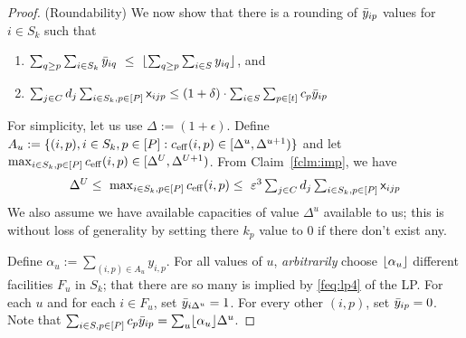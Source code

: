 \begin{proof}
\noindent
(Roundability)
We now show that there is a rounding of $\bar{y}_{ip}$ values for $i\in S_k$ such that
		\begin{enumerate}
			\item $\sum_{q \geq p} \sum_{i\in S_k} \bar{y}_{iq} ~\leq~ \lfloor\sum_{q \geq p}\sum_{i\in S} y_{iq}\rfloor$, and
			\item $\sum_{j\in C} d_j \sum_{i\in S_k,p\in [P]} {\mathsf x}_{ijp} \leq (1+\delta)\cdot \sum_{i\in S} \sum_{p\in [t]} c_p\bar{y}_{ip}$
		\end{enumerate}

\noindent
For simplicity, let us use $\Delta := (1+\epsilon)$.
Define $A_u := \{(i,p), i\in S_k,p\in [P]: c_{\mathrm{eff}}(i,p) \in [\Delta^u,\Delta^{u+1})\}$ and let $\max_{i\in S_k,p\in [P]} c_{\mathrm{eff}}(i,p) \in [\Delta^U,\Delta^{U+1})$.
From Claim~\ref{fclm:imp}, we have
\[
\textstyle \Delta^U \leq ~ \max_{i\in S_k,p\in [P]} c_{\mathrm{eff}}(i,p) \leq ~\varepsilon^3 \sum_{j\in C} d_j \sum_{i\in S_k,p\in [P]} {\mathsf x}_{ijp}
\]
We also assume we have available capacities of value $\Delta^u$ available to us; this is without loss of generality by setting there $k_p$ value to $0$
if there don't exist any.

Define $\alpha_u := \sum_{(i,p) \in A_u} y_{i,p}$. For all values of $u$,
{\em arbitrarily} choose $\lfloor\alpha_u\rfloor$ different facilities $F_u$ in $S_k$; that there are so many is implied by \eqref{feq:lp4} of the LP.
For each $u$ and for each $i\in F_u$, set $\bar{y}_{i\Delta^u} = 1$. For every other $(i,p)$, set $\bar{y}_{ip} = 0$.
Note that  $\sum_{i\in S,p\in [P]}c_p\bar{y}_{ip} = \sum_u \lfloor\alpha_u\rfloor\Delta^u$.


\end{proof}
